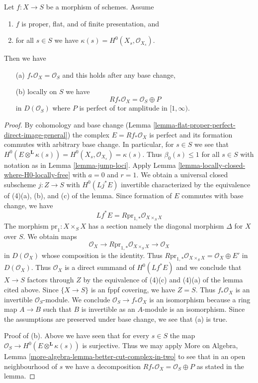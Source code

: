 \begin{lemma}
\label{lemma-proper-flat-h0}
Let $f : X \to S$ be a morphism of schemes. Assume
\begin{enumerate}
\item $f$ is proper, flat, and of finite presentation, and
\item for all $s \in S$ we have $\kappa(s) = H^0(X_s, \mathcal{O}_{X_s})$.
\end{enumerate}
Then we have
\begin{enumerate}
\item[(a)] $f_*\mathcal{O}_X = \mathcal{O}_S$ and
this holds after any base change,
\item[(b)] locally on $S$ we have
$$
Rf_*\mathcal{O}_X = \mathcal{O}_S \oplus P
$$
in $D(\mathcal{O}_S)$
where $P$ is perfect of tor amplitude in $[1, \infty)$.
\end{enumerate}
\end{lemma}

\begin{proof}
By cohomology and base change
(Lemma \ref{lemma-flat-proper-perfect-direct-image-general})
the complex $E = Rf_*\mathcal{O}_X$
is perfect and its formation commutes with arbitrary base change.
In particular, for $s \in S$ we see that
$H^0(E \otimes^\mathbf{L} \kappa(s)) =
H^0(X_s, \mathcal{O}_{X_s}) = \kappa(s)$.
Thus $\beta_0(s) \leq 1$ for all $s \in S$ with notation as in
Lemma \ref{lemma-jump-loci}. Apply
Lemma \ref{lemma-locally-closed-where-H0-locally-free}
with $a = 0$ and $r = 1$. We obtain a universal closed subscheme
$j : Z \to S$ with $H^0(Lj^*E)$ invertible characterized
by the equivalence of (4)(a), (b), and (c) of the lemma.
Since formation of $E$ commutes with base change, we have
$$
Lf^*E = R\text{pr}_{1, *}\mathcal{O}_{X \times_S X}
$$
The morphism $\text{pr}_1 : X \times_S X$ has a section
namely the diagonal morphism $\Delta$ for $X$ over $S$.
We obtain maps
$$
\mathcal{O}_X \longrightarrow R\text{pr}_{1, *}\mathcal{O}_{X \times_S X}
\longrightarrow \mathcal{O}_X
$$
in $D(\mathcal{O}_X)$ whose composition is the identity. Thus
$R\text{pr}_{1, *}\mathcal{O}_{X \times_S X} = \mathcal{O}_X \oplus E'$
in $D(\mathcal{O}_X)$. Thus $\mathcal{O}_X$ is a direct summand of
$H^0(Lf^*E)$ and we conclude that $X \to S$ factors through $Z$
by the equivalence of (4)(c) and (4)(a) of the lemma cited above.
Since $\{X \to S\}$ is an fppf covering, we have $Z = S$.
Thus $f_*\mathcal{O}_X$ is an invertible $\mathcal{O}_S$-module.
We conclude $\mathcal{O}_S \to f_*\mathcal{O}_X$ is an isomorphism
because a ring map $A \to B$ such that $B$ is invertible as an $A$-module
is an isomorphism. Since the assumptions are preserved under base
change, we see that (a) is true.

\medskip\noindent
Proof of (b). Above we have seen that for every $s \in S$ the map
$\mathcal{O}_S \to H^0(E \otimes^\mathbf{L} \kappa(s))$ is surjective.
Thus we may apply
More on Algebra, Lemma \ref{more-algebra-lemma-better-cut-complex-in-two}
to see that in an open neighbourhood of $s$ we have
a decomposition $Rf_*\mathcal{O}_X = \mathcal{O}_S \oplus P$
as stated in the lemma.
\end{proof}

